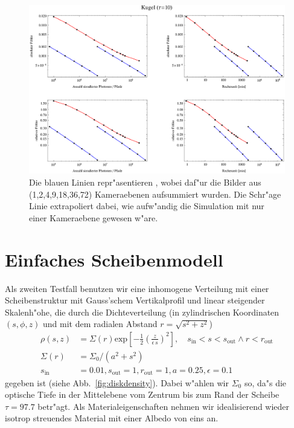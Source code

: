 		\begin{figure}
			\centering
			\includegraphics[angle=90,height=1.0\textheight]{sphere3errorplot.eps}
			\caption{Die blauen Linien repr"asentieren \mctd, wobei daf"ur die Bilder aus (1,2,4,9,18,36,72) Kameraebenen aufsummiert wurden. Die Schr"age Linie extrapoliert dabei, wie aufw"andig die Simulation mit nur einer Kameraebene gewesen w"are.}
			\label{fig:sphere3_error}
		\end{figure}
	
	\section{Einfaches Scheibenmodell}
	Als zweiten Testfall benutzen wir eine inhomogene Verteilung mit einer Scheibenstruktur mit Gauss'schem Vertikalprofil und linear steigender Skalenh"ohe, die durch die Dichteverteilung (in zylindrischen Koordinaten $(s,\phi,z)$ und mit dem radialen Abstand $r=\sqrt{s^2+z^2}$)
	\begin{align*}
		\rho(s,z)&=\Sigma(r)\text{exp}\left[-\frac{1}{2}\left(\frac{z}{\epsilon\,s}\right)^2\right],\quad s_\text{in}<s<s_\text{out}\land r<r_\text{out} \\
		\Sigma(r)&=\Sigma_0 / (a^2+s^2) \\
		s_\text{in}&=0.01, s_\text{out}=1, r_\text{out}=1, a=0.25, \epsilon=0.1
	\end{align*}
	gegeben ist (siehe Abb.~\ref{fig:diskdensity}).	Dabei w"ahlen wir $\Sigma_0$ so, da"s die optische Tiefe in der Mittelebene vom Zentrum bis zum Rand der Scheibe $\tau=97.7$ betr"agt. Als Materialeigenschaften nehmen wir idealisierend wieder isotrop streuendes Material mit einer Albedo von eins an.
	
